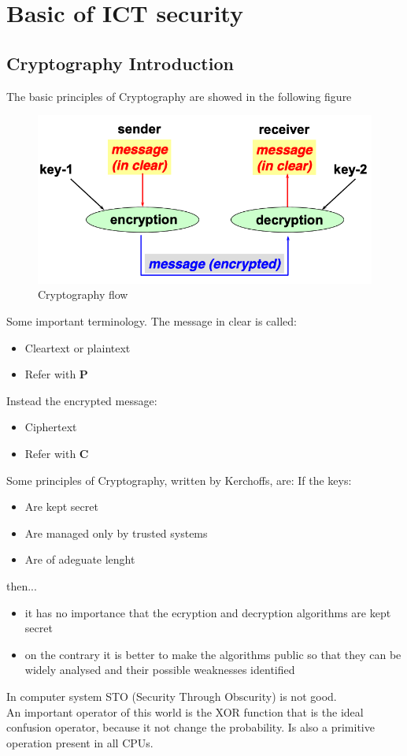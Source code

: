 \documentclass[12pt]{article}
\begin{document}
\section{Basic of ICT security}
\subsection{Cryptography Introduction}
The basic principles of Cryptography are showed in the following figure
\begin{figure}[H]
  \includegraphics[width=\linewidth]{images/crypt.png}
  \caption{Cryptography flow}
  \label{fig:crypt}
\end{figure}
Some important terminology. The message in clear is called:
\begin{itemize}
  \item Cleartext or plaintext
  \item Refer with \textbf{P}
\end{itemize}
Instead the encrypted message:
\begin{itemize}
  \item Ciphertext
  \item Refer with \textbf{C}
\end{itemize}

Some principles of Cryptography, written by Kerchoffs, are:
If the keys:
\begin{itemize}
  \item Are kept secret
  \item Are managed only by trusted systems
  \item Are of adeguate lenght
\end{itemize}
then...
\begin{itemize}
  \item it has no importance that the ecryption and decryption algorithms are kept secret
  \item on the contrary it is better to make the algorithms public so that they can be widely analysed and their possible weaknesses identified
\end{itemize}
In computer system STO (Security Through Obscurity) is not good.\\
An important operator of this world is the XOR function that is the ideal confusion operator, because it not change the probability. Is also a primitive operation present in all CPUs.
\end{document}
